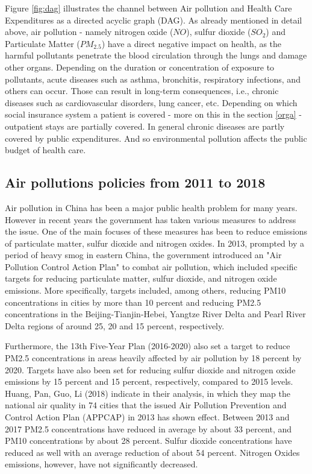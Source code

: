 \documentclass[
]{article}
\begin{document}
Figure \ref{fig:dag} illustrates the channel between Air pollution and Health Care Expenditures as a directed acyclic graph (DAG). As already mentioned in detail above, air pollution - namely nitrogen oxide ($NO$), sulfur dioxide ($SO_2$) and Particulate Matter ($PM_{2.5}$) have a direct negative impact on health, as the harmful pollutants penetrate the blood circulation through the lungs and damage other organs. Depending on the duration or concentration of exposure to pollutants, acute diseases such as asthma, bronchitis, respiratory infections, and others can occur. Those can result in long-term consequences, i.e., chronic diseases such as cardiovascular disorders, lung cancer, etc.  
Depending on which social insurance system a patient is covered - more on this in the section \ref{orga} - outpatient stays are partially covered. In general chronic diseases are partly covered by public expenditures. And so environmental pollution affects the public budget of health care. 
	
	
	\subsection{Air pollutions policies from 2011 to 2018}
	
	Air pollution in China has been a major public health problem for many years. However in recent years the government has taken various measures to address the issue. One of the main focuses of these measures has been to reduce emissions of particulate matter, sulfur dioxide and nitrogen oxides. 
	In 2013, prompted by a period of heavy smog in eastern China, the government introduced an "Air Pollution Control Action Plan" to combat air pollution, which included specific targets for reducing particulate matter, sulfur dioxide, and nitrogen oxide emissions. More specifically, targets included, among others, reducing PM10 concentrations in cities by more than 10 percent and reducing PM2.5 concentrations in the Beijing-Tianjin-Hebei, Yangtze River Delta and Pearl River Delta regions of around 25, 20 and 15 percent, respectively. %
	
	Furthermore, the 13th Five-Year Plan (2016-2020) also set a target to reduce PM2.5 concentrations in areas heavily affected by air pollution by 18 percent by 2020. Targets have also been set for reducing sulfur dioxide and nitrogen oxide emissions by 15 percent and 15 percent, respectively, compared to 2015 levels. %
	Huang, Pan, Guo, Li (2018) indicate in their analysis, in which they map the national air quality in 74 cities that the issued Air Pollution Prevention and Control Action Plan (APPCAP) in 2013 has shown effect. Between 2013 and 2017 PM2.5 concentrations have reduced in average by about 33 percent, and PM10 concentrations by about 28 percent. Sulfur dioxide concentrations have reduced as well with an average reduction of about 54 percent. Nitrogen Oxides emissions, however, have not significantly decreased. %
	
\end{document}
